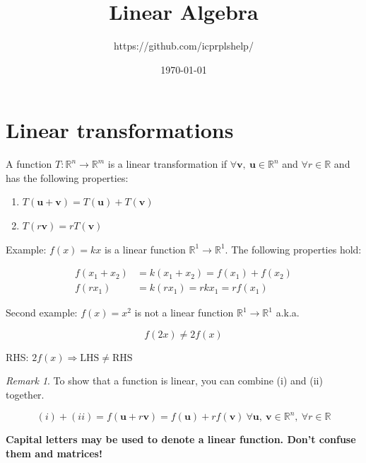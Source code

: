 \documentclass[12pt]{article}
\title{Linear Algebra}
\author{https://github.com/icprplshelp/}
\date{\today}
\theoremstyle{plain}
\theoremstyle{remark}
\newtheorem{remark}{Remark}
\theoremstyle{definition}
\begin{document}
\maketitle

{
\setcounter{tocdepth}{3}
\tableofcontents
}

\section{Linear transformations}

A function \(T:\mathbb{R}^{n} \rightarrow \mathbb{R}^{m}\) is a linear
transformation if
\(\forall\mathbf{v},\ \mathbf{u} \in \mathbb{R}^{n}\) and
\(\forall r\mathbb{\in R}\) and has the following properties:

\begin{enumerate}
\def\labelenumi{(\roman{enumi})}
\item
  \(T\left( \mathbf{u} + \mathbf{v} \right) = T\left( \mathbf{u} \right) + T(\mathbf{v})\)
\item
  \(T\left( r\mathbf{v} \right) = rT(\mathbf{v})\)
\end{enumerate}

Example: \(f(x) = kx\) is a linear function
\(\mathbb{R}^{1} \rightarrow \mathbb{R}^{1}\). The following properties
hold:

\begin{align*}
f\left( x_{1} + x_{2} \right) &= k\left( x_{1} + x_{2} \right) = f\left( x_{1} \right) + f\left( x_{2} \right) \\
f\left( rx_{1} \right) &= k\left( rx_{1} \right) = rkx_{1} = rf(x_{1})
\end{align*}


Second example: \(f(x) = x^{2}\) is not a linear function
\(\mathbb{R}^{1} \rightarrow \mathbb{R}^{1}\) a.k.a.

\[f(2x) \neq 2f(x)
\]

RHS: \(2f(x) \Rightarrow \text{LHS} \neq \text{RHS}\)

\begin{remark}
To show that a function is linear, you can combine (i)
and (ii) together.

\[{(i) + \left( ii \right) = f\left( \mathbf{u} + r\mathbf{v} \right) }{= f\left( \mathbf{u} \right) + rf\left( \mathbf{v} \right)\ \forall\mathbf{u},\ \mathbf{v} }{\in \mathbb{R}^{n},\ \forall r\mathbb{\in R}} \]
\end{remark}

\textbf{Capital letters may be used to denote a linear function. Don't
confuse them and matrices!}
\end{document}

